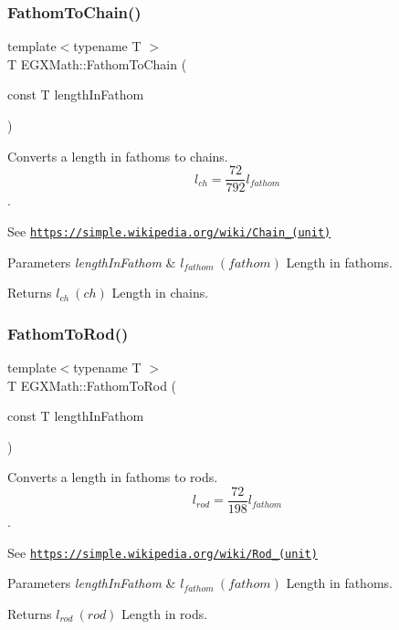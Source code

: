 \subsubsection{\texorpdfstring{Fathom\+To\+Chain()}{FathomToChain()}}
{\footnotesize\ttfamily template$<$typename T $>$ \\
T E\+G\+X\+Math\+::\+Fathom\+To\+Chain (\begin{DoxyParamCaption}\item[{const T}]{length\+In\+Fathom }\end{DoxyParamCaption})}



Converts a length in fathoms to chains. \[ l_{ch}= \frac{72}{792} l_{fathom} \]. 

See \href{https://simple.wikipedia.org/wiki/Chain_(unit)}{\tt https\+://simple.\+wikipedia.\+org/wiki/\+Chain\+\_\+(unit)} 
\begin{DoxyParams}{Parameters}
{\em length\+In\+Fathom} & $ l_{fathom}\ (fathom)$ Length in fathoms. \\
\hline
\end{DoxyParams}
\begin{DoxyReturn}{Returns}
$ l_{ch}\ (ch)$ Length in chains. 
\end{DoxyReturn}
\mbox{\label{group___e_g_x_math-_conversions-_length_conversions-_nautical-_fathom-_surveyors_ga6afd3032ea722bf44ba979d3e37a2dc2}} 
\subsubsection{\texorpdfstring{Fathom\+To\+Rod()}{FathomToRod()}}
{\footnotesize\ttfamily template$<$typename T $>$ \\
T E\+G\+X\+Math\+::\+Fathom\+To\+Rod (\begin{DoxyParamCaption}\item[{const T}]{length\+In\+Fathom }\end{DoxyParamCaption})}



Converts a length in fathoms to rods. \[ l_{rod}= \frac{72}{198} l_{fathom} \]. 

See \href{https://simple.wikipedia.org/wiki/Rod_(unit)}{\tt https\+://simple.\+wikipedia.\+org/wiki/\+Rod\+\_\+(unit)} 
\begin{DoxyParams}{Parameters}
{\em length\+In\+Fathom} & $ l_{fathom}\ (fathom)$ Length in fathoms. \\
\hline
\end{DoxyParams}
\begin{DoxyReturn}{Returns}
$ l_{rod}\ (rod)$ Length in rods. 
\end{DoxyReturn}
